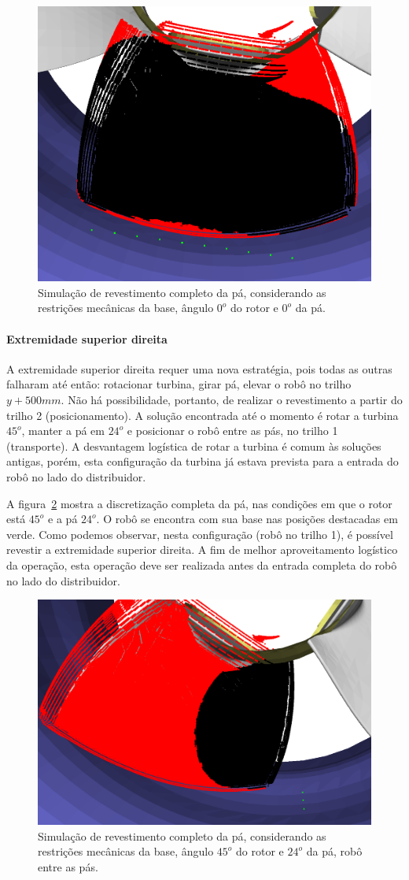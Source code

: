 \begin{figure}[!ht]
	\centering	
	\includegraphics[width=.5\columnwidth]{method/figs/simcomp1_4.png}
	\caption{Simulação de revestimento completo da pá, considerando as
	restrições mecânicas da base, ângulo $0^o$ do rotor e $0^o$ da pá.}
	\label{fig::simcomp1_4}
\end{figure}

\paragraph{Extremidade superior direita}
A extremidade superior direita requer uma nova estratégia, pois todas as
outras falharam até então: rotacionar turbina, girar pá, elevar o robô no trilho
$y+500 mm$. Não há possibilidade, portanto, de realizar o revestimento a partir
do trilho 2 (posicionamento). A solução encontrada até o momento é rotar a
turbina $45^o$, manter a pá em $24^o$ e posicionar o robô entre as pás, no
trilho 1 (transporte). A desvantagem logística de rotar a turbina é comum às
soluções antigas, porém, esta configuração da turbina já estava prevista para
a entrada do robô no lado do distribuidor.

A figura~\ref{fig::simcomp1_7} mostra a discretização completa da pá, nas
condições em que o rotor está $45^o$ e a pá $24^o$. O robô se encontra
com sua base nas posições destacadas em verde. Como podemos observar, nesta
configuração (robô no trilho 1), é possível revestir a extremidade
superior direita. A fim de melhor aproveitamento logístico da
operação, esta operação deve ser realizada antes da entrada completa
do robô no lado do distribuidor.

\begin{figure}[!ht]
	\centering	
	\includegraphics[width=.5\columnwidth]{method/figs/simcomp1_7.png}
	\caption{Simulação de revestimento completo da pá, considerando as
	restrições mecânicas da base, ângulo $45^o$ do rotor e $24^o$ da pá, robô
	entre as pás.}
	\label{fig::simcomp1_7}
\end{figure}


